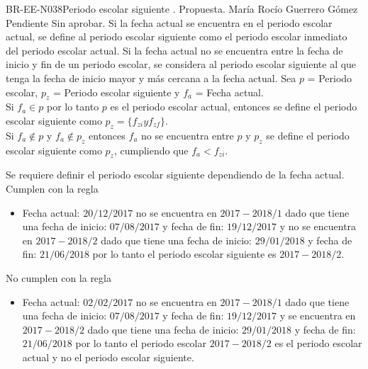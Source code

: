 \begin{BusinessRule}{BR-EE-N038}{Periodo escolar siguiente}
	{\bcIntegridad}    %
	{\btEnabler}     %
	{\blControlling}    %
	.
	\BRItem[Estado] Propuesta.
	 María Rocío Guerrero Gómez
	 Pendiente
	 Sin aprobar.
	\BRItem[Descripción] Si la fecha actual se encuentra en el periodo escolar actual, se define al periodo escolar siguiente como el periodo escolar inmediato del periodo escolar actual. Si la fecha actual no se encuentra entre la fecha de inicio y fin de un periodo escolar, se considera al periodo escolar siguiente al que tenga la fecha de inicio mayor y más cercana a la fecha actual.
	\BRItem[Sentencia]  
	Sea $p$ = Periodo escolar, $p_{z}$ = Periodo escolar siguiente y $f_a$ = Fecha actual.\\
	Si $f_a \in p$ por lo tanto $p$ es el periodo escolar actual, entonces se define el periodo escolar siguiente como $p_{z} = \{f_{zi} y f_{zf}\}$.\\	
	Si $f_{a} \not \in p$ y $f_{a} \not \in p_{z}$ entonces $f_{a}$ no se encuentra entre $p$ y $p_{z}$ se define el periodo escolar siguiente como $p_{z}$, cumpliendo que $f_{a} < f_{zi}$.
		
	\BRItem[Motivación] Se requiere definir el periodo escolar siguiente dependiendo de la fecha actual.
	 Cumplen con la regla
	\begin{itemize}
		\item Fecha actual: $20/12/2017$ no se encuentra en $2017-2018/1$  dado que tiene una fecha de inicio: $07/08/2017$ y  fecha de fin: $19/12/2017$ y no se encuentra en $2017-2018/2$ dado que tiene una fecha de inicio: $29/01/2018$ y  fecha de fin: $21/06/2018$ por lo tanto el periodo escolar siguiente es $2017-2018/2$. 		
	\end{itemize}
	 No cumplen con la regla
	\begin{itemize}
		\item Fecha actual: $02/02/2017$ no se encuentra en $2017-2018/1$  dado que tiene una fecha de inicio: $07/08/2017$ y  fecha de fin: $19/12/2017$ y se encuentra en $2017-2018/2$ dado que tiene una fecha de inicio: $29/01/2018$ y  fecha de fin: $21/06/2018$ por lo tanto el periodo escolar $2017-2018/2$ es el periodo escolar actual y no el periodo escolar siguiente. 
	\end{itemize}
\end{BusinessRule}

